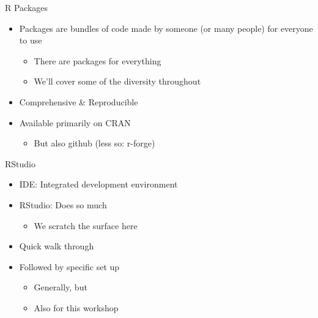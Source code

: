 \documentclass[
  ignorenonframetext,
]{beamer}
\providecommand{\tightlist}{%
  \setlength{\itemsep}{0pt}\setlength{\parskip}{0pt}}
\begin{document}
\begin{frame}{R Packages}
\protect\hypertarget{r-packages}{}

\begin{itemize}
\tightlist
\item
  Packages are bundles of code made by someone (or many people) for
  everyone to use

  \begin{itemize}
  \tightlist
  \item
    There are packages for everything
  \item
    We'll cover some of the diversity throughout
  \end{itemize}
\item
  Comprehensive \& Reproducible
\item
  Available primarily on CRAN

  \begin{itemize}
  \tightlist
  \item
    But also github (less so: r-forge)
  \end{itemize}
\end{itemize}

\end{frame}

\begin{frame}{RStudio}
\protect\hypertarget{rstudio}{}

\begin{itemize}
\tightlist
\item
  IDE: Integrated development environment
\item
  RStudio: Does so much

  \begin{itemize}
  \tightlist
  \item
    We scratch the surface here
  \end{itemize}
\item
  Quick walk through
\item
  Followed by specific set up

  \begin{itemize}
  \tightlist
  \item
    Generally, but
  \item
    Also for this workshop
  \end{itemize}
\end{itemize}

\end{frame}
\end{document}
